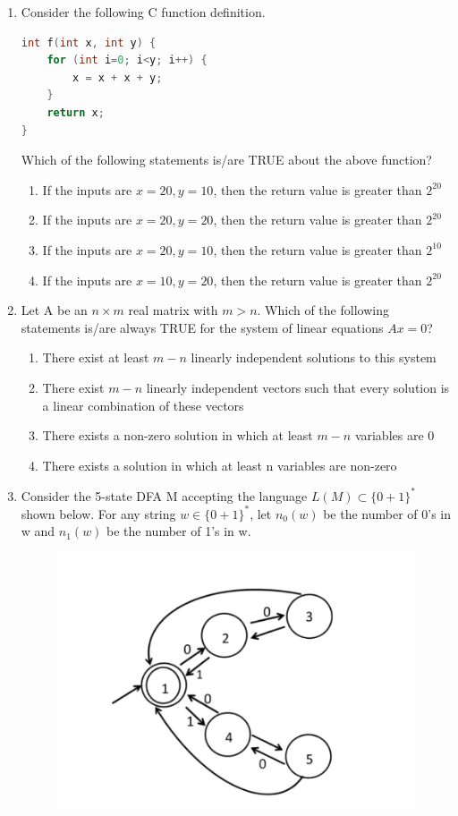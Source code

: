 \documentclass[a4paper, 11pt]{article}
\begin{document}
\begin{enumerate}
    \item Consider the following C function definition.
    \begin{lstlisting}[language=C]
int f(int x, int y) {
    for (int i=0; i<y; i++) {
        x = x + x + y;
    }
    return x;
}
    \end{lstlisting}
    Which of the following statements is/are TRUE about the above function?
    \begin{enumerate}
        \item If the inputs are $x=20, y=10$, then the return value is greater than $2^{20}$
        \item If the inputs are $x=20, y=20$, then the return value is greater than $2^{20}$
        \item If the inputs are $x=20, y=10$, then the return value is greater than $2^{10}$
        \item If the inputs are $x=10, y=20$, then the return value is greater than $2^{20}$
    \end{enumerate}
    \hfill{}

    \item Let A be an $n \times m$ real matrix with $m > n$. Which of the following statements is/are always TRUE for the system of linear equations $Ax=0$?
    \begin{enumerate}
        \item There exist at least $m-n$ linearly independent solutions to this system
        \item There exist $m-n$ linearly independent vectors such that every solution is a linear combination of these vectors
        \item There exists a non-zero solution in which at least $m-n$ variables are 0
        \item There exists a solution in which at least n variables are non-zero
    \end{enumerate}
    \hfill{}

    \item Consider the 5-state DFA M accepting the language $L(M) \subset \{0+1\}^*$ shown below. For any string $w \in \{0+1\}^*$, let $n_0(w)$ be the number of 0's in w and $n_1(w)$ be the number of 1's in w.

    \begin{figure}[H]
        \centering
        \includegraphics[width=0.5\columnwidth]{figs/q50.png}
        \caption*{}
        \label{fig:q50}
    \end{figure}


\end{enumerate}
\end{document}
